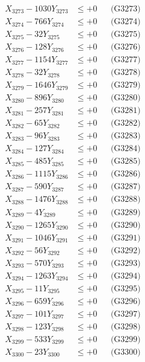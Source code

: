 \documentclass[a4paper,10pt]{article}
\begin{document}
{\begin{align}
X_{3273} - 1030Y_{3273} &\leq +0 && \text{(G3273)} \\
X_{3274} - 766Y_{3274} &\leq +0 && \text{(G3274)} \\
X_{3275} - 32Y_{3275} &\leq +0 && \text{(G3275)} \\
X_{3276} - 128Y_{3276} &\leq +0 && \text{(G3276)} \\
X_{3277} - 1154Y_{3277} &\leq +0 && \text{(G3277)} \\
X_{3278} - 32Y_{3278} &\leq +0 && \text{(G3278)} \\
X_{3279} - 1646Y_{3279} &\leq +0 && \text{(G3279)} \\
X_{3280} - 896Y_{3280} &\leq +0 && \text{(G3280)} \\
\allowbreak
X_{3281} - 257Y_{3281} &\leq +0 && \text{(G3281)} \\
X_{3282} - 65Y_{3282} &\leq +0 && \text{(G3282)} \\
X_{3283} - 96Y_{3283} &\leq +0 && \text{(G3283)} \\
X_{3284} - 127Y_{3284} &\leq +0 && \text{(G3284)} \\
X_{3285} - 485Y_{3285} &\leq +0 && \text{(G3285)} \\
X_{3286} - 1115Y_{3286} &\leq +0 && \text{(G3286)} \\
X_{3287} - 590Y_{3287} &\leq +0 && \text{(G3287)} \\
X_{3288} - 1476Y_{3288} &\leq +0 && \text{(G3288)} \\
X_{3289} - 4Y_{3289} &\leq +0 && \text{(G3289)} \\
X_{3290} - 1265Y_{3290} &\leq +0 && \text{(G3290)} \\
\allowbreak
X_{3291} - 1046Y_{3291} &\leq +0 && \text{(G3291)} \\
X_{3292} - 56Y_{3292} &\leq +0 && \text{(G3292)} \\
X_{3293} - 570Y_{3293} &\leq +0 && \text{(G3293)} \\
X_{3294} - 1263Y_{3294} &\leq +0 && \text{(G3294)} \\
X_{3295} - 11Y_{3295} &\leq +0 && \text{(G3295)} \\
X_{3296} - 659Y_{3296} &\leq +0 && \text{(G3296)} \\
X_{3297} - 101Y_{3297} &\leq +0 && \text{(G3297)} \\
X_{3298} - 123Y_{3298} &\leq +0 && \text{(G3298)} \\
X_{3299} - 533Y_{3299} &\leq +0 && \text{(G3299)} \\
X_{3300} - 23Y_{3300} &\leq +0 && \text{(G3300)} \\

\end{align}}
\end{document}

